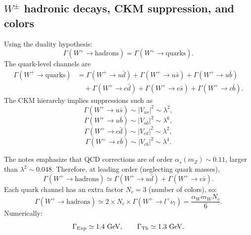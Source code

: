 \begin{itemize}
\subsection{$W^\pm$ hadronic decays, CKM suppression, and colors}
Using the duality hypothesis:
\[
\Gamma(W^+\to \text{hadrons})=\Gamma(W^+\to \text{quarks}).
\]
The quark-level channels are
\begin{align}
\Gamma(W^+\to \text{quarks})&=
\Gamma(W^+\to u\bar d)+\Gamma(W^+\to u\bar s)+\Gamma(W^+\to u\bar b)\nonumber\\
&\quad+\Gamma(W^+\to c\bar d)+\Gamma(W^+\to c\bar s)+\Gamma(W^+\to c\bar b).
\end{align}
The CKM hierarchy implies suppressions such as
\[
\Gamma(W^+\to u\bar s)\sim |V_{us}|^2\sim \lambda^2,
\]
\[
\Gamma(W^+\to u\bar b)\sim |V_{ub}|^2\sim \lambda^6,
\]
\[
\Gamma(W^+\to c\bar d)\sim |V_{cd}|^2\sim \lambda^2,
\]
\[
\Gamma(W^+\to c\bar b)\sim |V_{cb}|^2\sim \lambda^4.
\]

The notes emphasize that QCD corrections are of order $\alpha_s(m_Z)\sim 0.11$, larger than $\lambda^2\sim 0.048$.
Therefore, at leading order (neglecting quark masses),
\begin{equation}
\Gamma(W^+\to \text{hadrons})
\simeq \Gamma(W^+\to u\bar d)+\Gamma(W^+\to c\bar s).
\end{equation}
Each quark channel has an extra factor $N_c=3$ (number of colors), so:
\begin{equation}
\boxed{
\Gamma(W^+\to \text{hadrons})
\simeq 2\times N_c \times \Gamma(W^+\to l^+\nu_l)
=
\frac{\alpha_W m_W N_c}{6}.
}
\label{eq:Whadronic}
\end{equation}
Numerically:
\[
\Gamma_{\rm Exp}\simeq 1.4~\mathrm{GeV},
\qquad
\Gamma_{\rm Th}\simeq 1.3~\mathrm{GeV}.
\]


\end{itemize}
